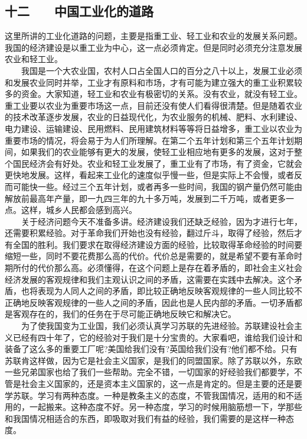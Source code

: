 \documentclass[cn,11pt,chinese]{elegantbook}
\def\myformat#1{\hfil\hfil #1}
\begin{document}
\subsection*{\myformat{十二　　中国工业化的道路}}
这里所讲的工业化道路的问题，主要是指重工业、轻工业和农业的发展关系问题。我国的经济建设是以重工业为中心，这一点必须肯定。但是同时必须充分注意发展农业和轻工业。\\
　　我国是一个大农业国，农村人口占全国人口的百分之八十以上，发展工业必须和发展农业同时并举，工业才有原料和市场，才有可能为建立强大的重工业积累较多的资金。大家知道，轻工业和农业有极密切的关系。没有农业，就没有轻工业。重工业要以农业为重要市场这一点，目前还没有使人们看得很清楚。但是随着农业的技术改革逐步发展，农业的日益现代化，为农业服务的机械、肥料、水利建设、电力建设、运输建设、民用燃料、民用建筑材料等等将日益增多，重工业以农业为重要市场的情况，将会易于为人们所理解。在第二个五年计划和第三个五年计划期间，如果我们的农业能够有更大的发展，使轻工业相应地有更多的发展，这对于整个国民经济会有好处。农业和轻工业发展了，重工业有了市场，有了资金，它就会更快地发展。这样，看起来工业化的速度似乎慢一些，但是实际上不会慢，或者反而可能快一些。经过三个五年计划，或者再多一些时间，我国的钢产量仍然可能由解放前最高年产量，即一九四三年的九十多万吨，发展到二千万吨，或者更多一点。这样，城乡人民都会感到高兴。\\
　　关于经济问题今天不准备多讲。经济建设我们还缺乏经验，因为才进行七年，还需要积累经验。对于革命我们开始也没有经验，翻过斤斗，取得了经验，然后才有全国的胜利。我们要求在取得经济建设方面的经验，比较取得革命经验的时间要缩短一些，同时不要花费那么高的代价。代价总是需要的，就是希望不要有革命时期所付的代价那么高。必须懂得，在这个问题上是存在着矛盾的，即社会主义社会经济发展的客观规律和我们主观认识之间的矛盾，这需要在实践中去解决。这个矛盾，也将表现为人同人之间的矛盾，即比较正确地反映客观规律的一些人同比较不正确地反映客观规律的一些人之间的矛盾，因此也是人民内部的矛盾。一切矛盾都是客观存在的，我们的任务在于尽可能正确地反映它和解决它。\\
　　为了使我国变为工业国，我们必须认真学习苏联的先进经验。苏联建设社会主义已经有四十年了，它的经验对于我们是十分宝贵的。大家看吧，谁给我们设计和装备了这么多的重要工厂呢?美国给我们没有?英国给我们没有?他们都不给。只有苏联肯这样做，因为它是社会主义国家，是我们的同盟国家。除了苏联以外，东欧一些兄弟国家也给了我们一些帮助。完全不错，一切国家的好经验我们都要学，不管是社会主义国家的，还是资本主义国家的，这一点是肯定的。但是主要的还是要学苏联。学习有两种态度。一种是教条主义的态度，不管我国情况，适用的和不适用的，一起搬来。这种态度不好。另一种态度，学习的时候用脑筋想一下，学那些和我国情况相适合的东西，即吸取对我们有益的经验，我们需要的是这样一种态度。\\
\end{document}
